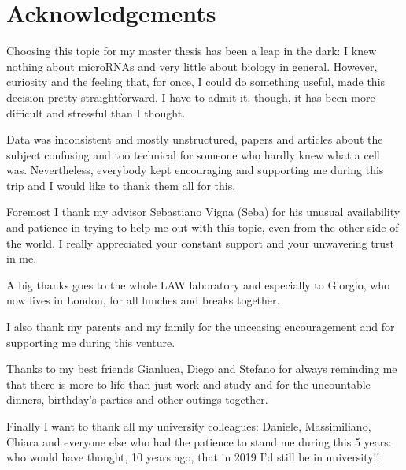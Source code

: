 \chapter*{Acknowledgements}

Choosing this topic for my master thesis has been a leap in the dark: I knew nothing about microRNAs and very little about biology in general. However, curiosity and the feeling that, for once, I could do something useful, made this decision pretty straightforward. I have to admit it, though, it has been more difficult and stressful than I thought.

Data was inconsistent and mostly unstructured, papers and articles about the subject confusing and too technical for someone who hardly knew what a cell was. Nevertheless, everybody kept encouraging and supporting me during this trip and I would like to thank them all for this.

Foremost I thank my advisor Sebastiano Vigna (Seba) for his unusual availability and patience in trying to help me out with this topic, even from the other side of the world. I really appreciated your constant support and your unwavering trust in me.  

A big thanks goes to the whole LAW laboratory and especially to Giorgio, who now lives in London, for all lunches and breaks together.

I also thank my parents and my family for the unceasing encouragement and for supporting me during this venture.

Thanks to my best friends Gianluca, Diego and Stefano for always reminding me that there is more to life than just work and study and for the uncountable dinners, birthday's parties and other outings together.

Finally I want to thank all my university colleagues: Daniele, Massimiliano, Chiara and everyone else who had the patience to stand me during this 5 years: who would have thought, 10 years ago, that in 2019 I'd still be in university!! 